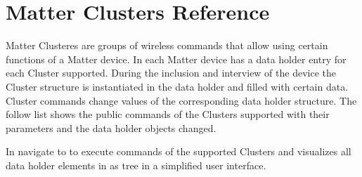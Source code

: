 \chapter{Matter Clusters Reference}
\label{cls}
\label{Clusters}

Matter Clusteres are groups of wireless commands that allow using certain functions of a Matter device.
In \zway each Matter device has a data holder entry for each Cluster supported. During the inclusion 
and interview of the device the Cluster structure is instantiated in the data holder and filled with 
certain data. Cluster commands change values of the corresponding data holder structure. The follow 
list shows the public commands of the Clusters supported with their parameters and the data holder 
objects changed.

In \zmeui navigate to  to execute commands 
of the supported Clusters and visualizes all data holder elements in as tree in 
a simplified user interface.
